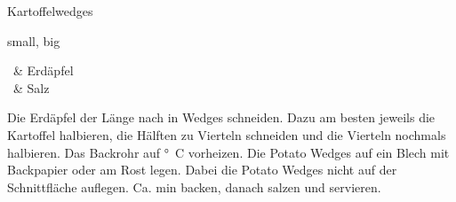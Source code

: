 \begin{recipe}
[
    preparationtime,
    bakingtime = 20 min,
    bakingtemperature = 210 \degree C,
    portion,
    calory,
    source,
]
{Kartoffelwedges}
    
    \graph
    {
        small,
        big
    }
    
    \ingredients
    {
		\ & Erdäpfel \\ \hline
		\ & Salz
    }
    
    \preparation
    {
        \step Die Erdäpfel der Länge nach in Wedges schneiden.
        \step Dazu am besten jeweils die Kartoffel halbieren, die Hälften zu Vierteln schneiden und die Vierteln nochmals 	halbieren.
        \step Das Backrohr auf \unit[210]{\degree C} vorheizen.
        \step Die Potato Wedges auf ein Blech mit Backpapier oder am Rost legen.
        \step Dabei die Potato Wedges nicht auf der Schnittfläche auflegen.
        \step Ca. \unit[20]{min} backen, danach salzen und servieren.
	}
\end{recipe}